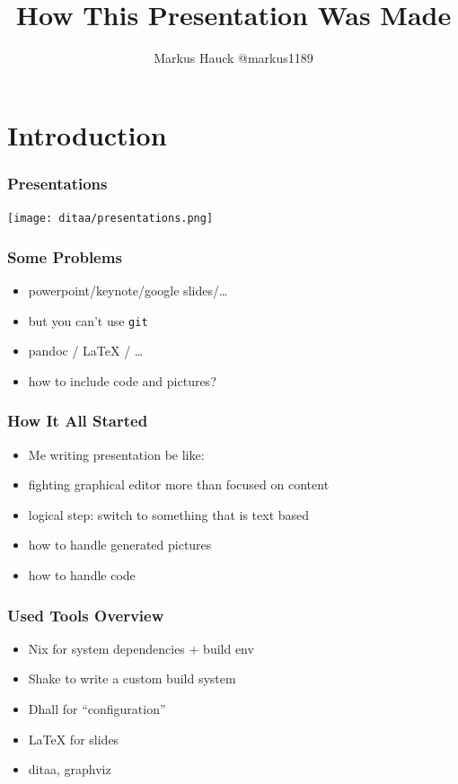 \documentclass{beamer}
\title{How This Presentation Was Made}
\author{Markus Hauck @markus1189}
\begin{document}
\begin{frame}
  \titlepage{}
\end{frame}

\section{Introduction}\label{sec:introduction}

\begin{frame}
  \frametitle{Presentations}
  \begin{center}
    \texttt{[image: ditaa/presentations.png]}
  \end{center}
\end{frame}

\begin{frame}
  \frametitle{Some Problems}
  \begin{itemize}
  \item powerpoint/keynote/google slides/\ldots{}
  \item but you can't use \texttt{git}
  \item pandoc / LaTeX / \ldots{}
  \item how to include code and pictures?
  \end{itemize}
\end{frame}

\begin{frame}
  \frametitle{How It All Started}
  \begin{itemize}
  \item Me writing presentation be like:
  \item fighting graphical editor more than focused on content
  \item logical step: switch to something that is text based
  \item how to handle generated pictures
  \item how to handle code
  \end{itemize}
\end{frame}

\begin{frame}
  \frametitle{Used Tools Overview}
  \begin{itemize}
  \item Nix for system dependencies + build env
  \item Shake to write a custom build system
  \item Dhall for ``configuration''
  \item LaTeX for slides
  \item ditaa, graphviz
  \end{itemize}
\end{frame}
\end{document}
